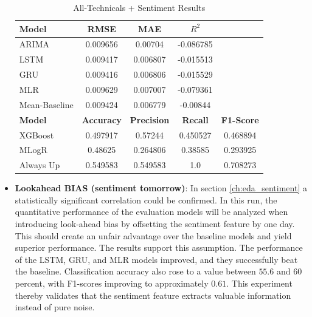 \documentclass[Master,english,IEEE]{twbook}
\begin{document}
\begin{itemize}
    \begin{table}[H]
    \centering
    \small %
    \setlength{\tabcolsep}{4pt} %
    \begin{tabular}{|lcccc|}
        \hline
        \textbf{Model} & \textbf{RMSE} & \textbf{MAE} & \textbf{$R^2$} & \\
        \hline
        ARIMA          & 0.009656      & 0.00704      & -0.086785      & \\
        LSTM           & 0.009417      & 0.006807     & -0.015513      & \\
        GRU            & 0.009416      & 0.006806     & -0.015529      & \\
        MLR            & 0.009629      & 0.007007     & -0.079361      & \\
        Mean-Baseline  & 0.009424      & 0.006779     & -0.00844       & \\
        \hline
        \textbf{Model} & \textbf{Accuracy} & \textbf{Precision} & \textbf{Recall} & \textbf{F1-Score} \\
        \hline
        XGBoost        & 0.497917      & 0.57244      & 0.450527       & 0.468894 \\
        MLogR          & 0.48625       & 0.264806     & 0.38585        & 0.293925 \\
        Always Up      & 0.549583      & 0.549583     & 1.0            & 0.708273 \\
        \hline
    \end{tabular}
    \caption{All-Technicals + Sentiment Results}
    \label{tab:res_all_technicals_plus_sentiment}
    \end{table}
    \item \textbf{Lookahead BIAS (sentiment tomorrow)}: In section \ref{ch:eda_sentiment} a statistically significant correlation could be confirmed. In this run, the quantitative performance of the evaluation models will be analyzed when introducing look-ahead bias by offsetting the sentiment feature by one day. This should create an unfair advantage over the baseline models and yield superior performance. The results support this assumption. The performance of the LSTM, GRU, and MLR models improved, and they successfully beat the baseline. Classification accuracy also rose to a value between $55.6$ and $60$ percent, with F1-scores improving to approximately $0.61$. This experiment thereby validates that the sentiment feature extracts valuable information instead of pure noise.
    \begin{table}[H]

\end{table}
\end{itemize}
\end{document}
